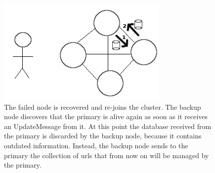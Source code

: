 \documentclass{article}
\begin{document}
\begin{figure}
\centering
\includegraphics[scale=0.45]{conflict3}
\caption{The failed node is recovered and re-joins the cluster. The backup node discovers that the primary is alive again as soon as it receives an UpdateMessage from it. At this point the database received from the primary is discarded by the backup node, because it contains outdated information. Instead, the backup node sends to the primary the collection of urls that from now on will be managed by the primary.}
\label{fig:conflict3}
\end{figure}
\end{document}
